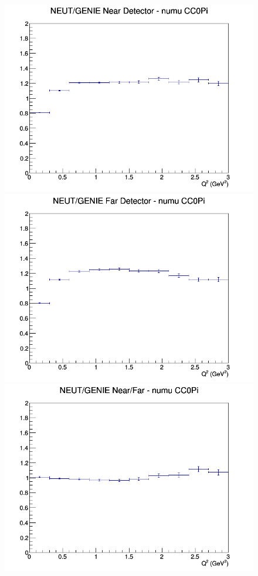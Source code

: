 \begin{figure}[h]
\endminipage
\newline
{}
\includegraphics[width=\linewidth]{eff_Q2/LAr/ratios/CC0Pi_NEUT_GENIE_numu_near_Q2.png}
\endminipage
{}
\includegraphics[width=\linewidth]{eff_Q2/LAr/ratios/CC0Pi_NEUT_GENIE_numu_far_Q2.png}
\endminipage
{}
\includegraphics[width=\linewidth]{eff_Q2/LAr/ratios/CC0Pi_NEUT_GENIE_numu_NF_Q2.png}

\end{figure}
